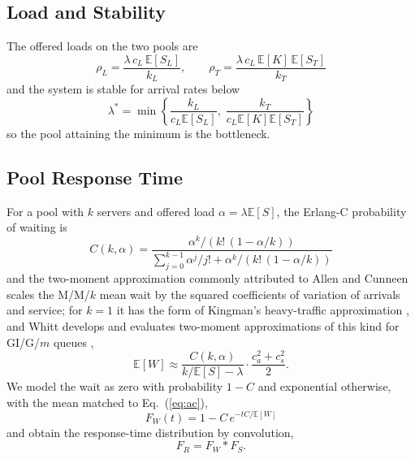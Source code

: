 \documentclass[journal]{IEEEtran}
\newcommand{\E}{\mathbb{E}}
\begin{document}
\subsection{Load and Stability}
The offered loads on the two pools are
\begin{equation}\rho_L=\frac{\lambda\,c_L\,\E[S_L]}{k_L},\qquad \rho_T=\frac{\lambda\,c_L\,\E[K]\,\E[S_T]}{k_T}\label{eq:load}\end{equation}
and the system is stable for arrival rates below
\begin{equation}\lambda^\ast=\min\left\{\frac{k_L}{c_L\E[S_L]},\;\frac{k_T}{c_L\E[K]\E[S_T]}\right\}\label{eq:lamstar}\end{equation}
so the pool attaining the minimum is the bottleneck.

\subsection{Pool Response Time}
For a pool with $k$ servers and offered load $\alpha=\lambda\E[S]$, the Erlang-C probability of waiting is
\begin{equation}C(k,\alpha)=\frac{\alpha^k/\left(k!\,(1-\alpha/k)\right)}{\sum_{j=0}^{k-1}\alpha^j/j!+\alpha^k/\left(k!\,(1-\alpha/k)\right)}\label{eq:erlang}\end{equation}
and the two-moment approximation commonly attributed to Allen and Cunneen scales the M/M/$k$ mean wait by the squared coefficients of variation of arrivals and service; for $k=1$ it has the form of Kingman's heavy-traffic approximation \cite{kingman1961heavy}, and Whitt develops and evaluates two-moment approximations of this kind for GI/G/$m$ queues \cite{whitt1993approx},
\begin{equation}\E[W]\approx\frac{C(k,\alpha)}{k/\E[S]-\lambda}\cdot\frac{c_a^2+c_s^2}{2}.\label{eq:ac}\end{equation}
We model the wait as zero with probability $1-C$ and exponential otherwise, with the mean matched to Eq.~(\ref{eq:ac}),
\begin{equation}F_W(t)=1-C\,e^{-tC/\E[W]}\label{eq:wait}\end{equation}
and obtain the response-time distribution by convolution,
\begin{equation}F_R=F_W\ast F_S.\label{eq:resp}\end{equation}
\end{document}
